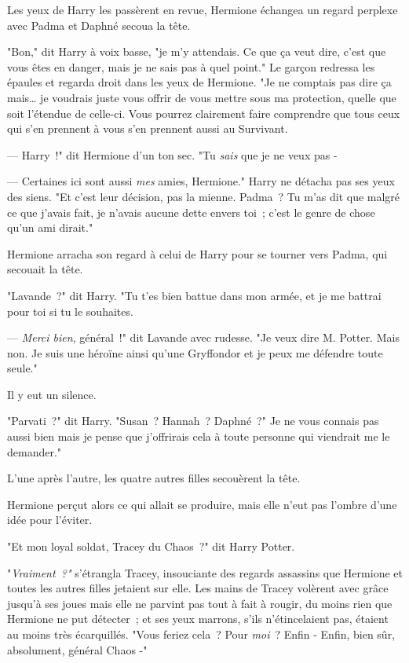 Les yeux de Harry les passèrent en revue, Hermione échangea un regard perplexe avec Padma et Daphné secoua la tête.

"Bon," dit Harry à voix basse, "je m'y attendais. Ce que ça veut dire, c'est que vous êtes en danger, mais je ne sais pas à quel point." Le garçon redressa les épaules et regarda droit dans les yeux de Hermione. "Je ne comptais pas dire ça mais… je voudrais juste vous offrir de vous mettre sous ma protection, quelle que soit l'étendue de celle-ci. Vous pourrez clairement faire comprendre que tous ceux qui s'en prennent à vous s'en prennent aussi au Survivant.

--- Harry~!" dit Hermione d'un ton sec. "Tu \emph{sais} que je ne veux pas -

--- Certaines ici sont aussi \emph{mes} amies, Hermione." Harry ne détacha pas ses yeux des siens. "Et c'est leur décision, pas la mienne. Padma~? Tu m'as dit que malgré ce que j'avais fait, je n'avais aucune dette envers toi~; c'est le genre de chose qu'un ami dirait."

Hermione arracha son regard à celui de Harry pour se tourner vers Padma, qui secouait la tête.

"Lavande~?" dit Harry. "Tu t'es bien battue dans mon armée, et je me battrai pour toi si tu le souhaites.

--- \emph{Merci bien}, général~!" dit Lavande avec rudesse. "Je veux dire M. Potter. Mais non. Je suis une héroïne ainsi qu'une Gryffondor et je peux me défendre toute seule."

Il y eut un silence.

"Parvati~?" dit Harry. "Susan~? Hannah~? Daphné~?" Je ne vous connais pas aussi bien mais je pense que j'offrirais cela à toute personne qui viendrait me le demander."

L'une après l'autre, les quatre autres filles secouèrent la tête.

Hermione perçut alors ce qui allait se produire, mais elle n'eut pas l'ombre d'une idée pour l'éviter.

"Et mon loyal soldat, Tracey du Chaos~?" dit Harry Potter.

"\emph{Vraiment~?"} s'étrangla Tracey, insouciante des regards assassins que Hermione et toutes les autres filles jetaient sur elle. Les mains de Tracey volèrent avec grâce jusqu'à ses joues mais elle ne parvint pas tout à fait à rougir, du moins rien que Hermione ne put détecter~; et ses yeux marrons, s'ils n'étincelaient pas, étaient au moins très écarquillés. "Vous feriez cela~? Pour \emph{moi}~? Enfin - Enfin, bien sûr, absolument, général Chaos -"

